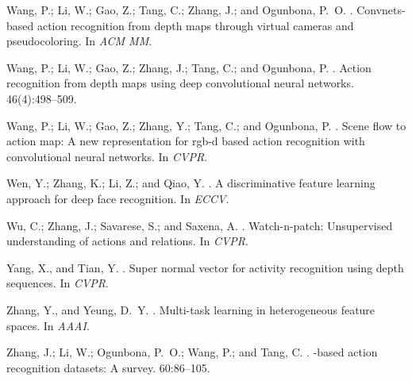 \documentclass[letterpaper]{article} %
\begin{document}
\begin{thebibliography}{}
Wang, P.; Li, W.; Gao, Z.; Tang, C.; Zhang, J.; and Ogunbona, P.~O.
.
\newblock Convnets-based action recognition from depth maps through virtual
  cameras and pseudocoloring.
\newblock In {\em ACM MM}.

Wang, P.; Li, W.; Gao, Z.; Zhang, J.; Tang, C.; and Ogunbona, P.
.
\newblock Action recognition from depth maps using deep convolutional neural
  networks.
 46(4):498--509.

Wang, P.; Li, W.; Gao, Z.; Zhang, Y.; Tang, C.; and Ogunbona, P.
.
\newblock Scene flow to action map: A new representation for rgb-d based action
  recognition with convolutional neural networks.
\newblock In {\em CVPR}.

Wen, Y.; Zhang, K.; Li, Z.; and Qiao, Y.
.
\newblock A discriminative feature learning approach for deep face recognition.
\newblock In {\em ECCV}.

Wu, C.; Zhang, J.; Savarese, S.; and Saxena, A.
.
\newblock Watch-n-patch: Unsupervised understanding of actions and relations.
\newblock In {\em CVPR}.

Yang, X., and Tian, Y.
.
\newblock Super normal vector for activity recognition using depth sequences.
\newblock In {\em CVPR}.

Zhang, Y., and Yeung, D.~Y.
.
\newblock Multi-task learning in heterogeneous feature spaces.
\newblock In {\em AAAI}.

Zhang, J.; Li, W.; Ogunbona, P.~O.; Wang, P.; and Tang, C.
.
-based action recognition datasets: A survey.
 60:86--105.

\end{thebibliography}
\end{document}

